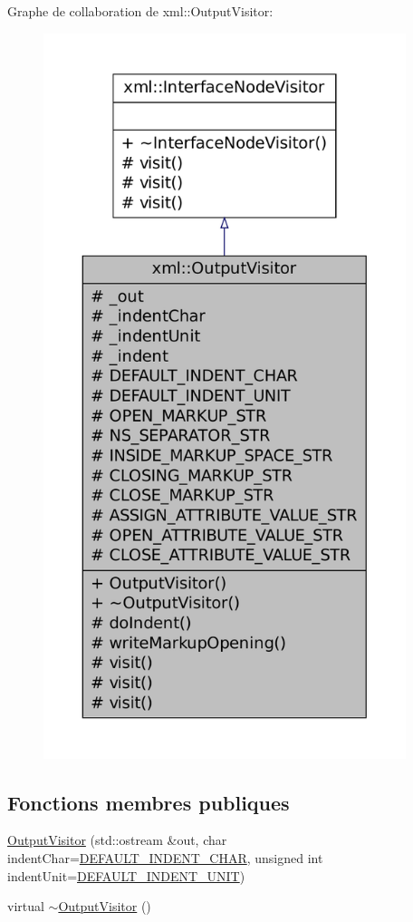 Graphe de collaboration de xml::OutputVisitor:
\nopagebreak
\begin{figure}[H]
\begin{center}
\leavevmode
\includegraphics[height=600pt]{classxml_1_1_output_visitor__coll__graph}
\end{center}
\end{figure}
\subsection*{Fonctions membres publiques}
\begin{DoxyCompactItemize}
\item 
\hyperlink{classxml_1_1_output_visitor_a09e8e0dd6ac2bbbf39cab4fa79a65a4b}{OutputVisitor} (std::ostream \&out, char indentChar=\hyperlink{classxml_1_1_output_visitor_ad61c526a1962865b37f22fdf252b63f3}{DEFAULT\_\-INDENT\_\-CHAR}, unsigned int indentUnit=\hyperlink{classxml_1_1_output_visitor_aa5e9426f0fdf70d3e0922837c8c99f93}{DEFAULT\_\-INDENT\_\-UNIT})
\item 
virtual \hyperlink{classxml_1_1_output_visitor_a6143fdb2f73ab2bafa7f2b3e3c32e48a}{$\sim$OutputVisitor} ()
\end{DoxyCompactItemize}
